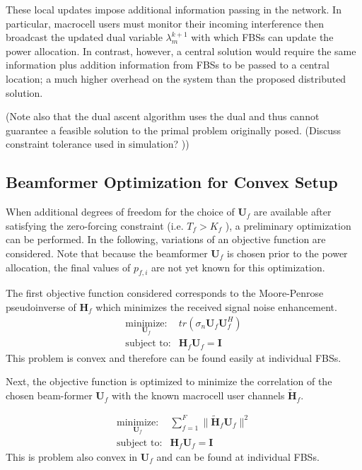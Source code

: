 \documentclass[12pt,a4paper]{report}
\begin{document}
These local updates impose additional information passing in the network. In particular, macrocell users must monitor their incoming interference then broadcast the updated dual variable $\lambda_{m}^{k+1}$ with which FBSs can update the power allocation. In contrast, however, a central solution would require the same information plus addition information from FBSs to be passed to a central location; a much higher overhead on the system than the proposed distributed solution. 

(Note also that the dual ascent algorithm uses the dual and thus cannot guarantee a feasible solution to the primal problem originally posed. (Discuss constraint tolerance used in simulation? ))

\subsection{Beamformer Optimization for Convex Setup}
When additional degrees of freedom for the choice of $\mathbf{U}_{f}$ are available after satisfying the zero-forcing constraint (i.e. $T_{f}> K_{f}$ ), a preliminary optimization can be performed. In the following, variations of an objective function are considered. Note that because the beamformer $\mathbf{U}_{f}$ is chosen prior to the power allocation, the final values of $p_{f,i}$ are not yet known for this optimization. 
\par
The first objective function considered corresponds to the Moore-Penrose pseudoinverse of $\mathbf{H}_{f}$ which minimizes the received signal noise enhancement. 
    \begin{equation}
    \begin{array}{ll}
    \underset{\mathbf{U}_{f} }{\text{minimize:}}   & tr(\sigma_n\mathbf{U}_{f}  \mathbf{U}_{f}^H)
    \\
    \mbox{subject to:} & \mathbf{H}_{f}  \mathbf{U}_{f} = \mathbf{I}
    \end{array}
    \label{e-opt-prob}
    \end{equation}
    This problem is convex and therefore can be found easily at individual FBSs. 

    \par
Next, the objective function is optimized to minimize the correlation of the chosen beam-former $\mathbf{U}_{f}$ with the known macrocell user channels $\mathbf{\tilde{H}}_{f}$.

    \begin{equation}
    \begin{array}{ll}
    \underset{\mathbf{U}_{f} }{\text{minimize:}}   & \sum^F_{f=1} \|\mathbf{\tilde{H}}_{f}  \mathbf{U}_{f}\|^2
    \\
    \mbox{subject to:} & \mathbf{H}_{f} \mathbf{U}_{f} = \mathbf{I}
    \end{array}
    \label{e-opt-prob}
    \end{equation}
This is problem also convex in $\mathbf{U}_{f}$ and can be found at individual FBSs.
\end{document}

